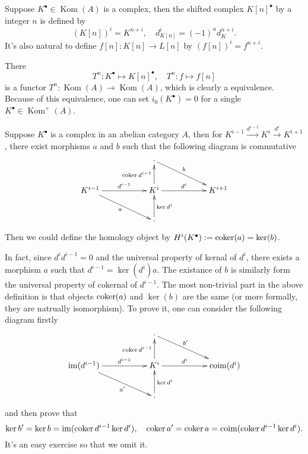 \begin{definition}
	Suppose $K^\bullet \in \operatorname{Kom}(A)$ is a complex, then 
	the shifted complex $K[n]^\bullet$ by a integer $n$
	is defined by
	\[
		(K[n])^i=K^{n+i},\quad d_{K[n]}^i=(-1)^n d_K^{n+i}.
	\]
	It's also natural to define $f[n]:K[n]\to L[n]$ by 
	$(f[n])^i=f^{n+i}$.
\end{definition}

There 
\[
	T^n:K^\bullet \mapsto K[n]^\bullet, \quad 
	T^n:f\mapsto f[n]
\]
is a functor $T^n:\operatorname{Kom}(A)\to \operatorname{Kom}(A)$, which
is clearly a equivalence. Because of this equivalence, one can set 
$i_0(K^\bullet)=0$ for a single $K^\bullet \in \operatorname{Kom}^+(A)$.

\begin{definition}
Suppose $K^\bullet$ is a complex in an abelian category $A$, then for 
$K^{i-1}\xrightarrow{d^{i-1}}K^i\xrightarrow{d^i}K^{i+1}$, there exist
morphisms $a$ and $b$ such that the following diagram is commutative
\[
	\begin{xy}
		\xymatrix{
			&&\cdot \ar[rrd]^-{b}&&\\
			K^{i-1} \ar[rr]^-{d^{i-1}} \ar[rrd]_{a}&& K^i \ar[rr]^-{d^i}\ar[u]^-{\coker d^{i-1}}&&K^{i+1}\\
			&&\cdot \ar[u]_-{\ker d^i}&&
		}
	\end{xy}
\]
Then we could define the homology object by 
$H^i(K^\bullet):=\operatorname{coker}(a)=\ker(b)$.
\end{definition}

In fact, since $d^id^{i-1}=0$ and the universal property of kernal of $d^i$,
there exists a morphism $a$ such that $d^{i-1}=\ker (d^i)a$. The existance
of $b$ is similarly form the universal property of cokernal of $d^{i-1}$.
The most non-trivial part in the above definition is that objects
$\operatorname{coker}(a)$ and $\ker(b)$ are the same (or more formally, they are natrually
isomorphism). To prove it, one can consider the following diagram firstly
\[
	\begin{xy}
		\xymatrix{
		&&\cdot \ar[rrd]^-{b'}&&\\
		\im(d^{i-1}) \ar[rr]^-{d^{i-1}} \ar[rrd]_-{a'}&& K^i \ar[rr]^-{d^i}\ar[u]^-{\coker d^{i-1}}&&\operatorname{coim}(d^{i}) \\
		&&\cdot \ar[u]_-{\ker d^i}&&
		}
	\end{xy}
\]
and then prove that 
\[
	\ker b'=\ker b= \operatorname{im} (\operatorname{coker} d^{i-1}\ker d^i),\quad  \operatorname{coker} a'=\operatorname{coker} a
	=\operatorname{coim} (\operatorname{coker} d^{i-1}\ker d^i).
\]
It's an easy exercise so that we omit it.

